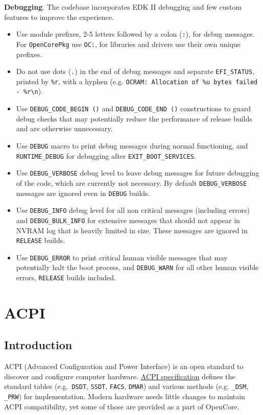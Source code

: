 \documentclass[]{article}
\makeatletter
\providecommand{\tightlist}{%
  \setlength{\itemsep}{0pt}\setlength{\parskip}{0pt}}
\renewcommand{\label}[1]{%
\zref@wrapper@immediate{\oldlabel{#1}}}  %
\makeatother
\begin{document}
\textbf{Debugging}. The codebase incorporates EDK II debugging and few custom features to improve the experience.
\begin{itemize}
\tightlist
\item Use module prefixes, 2-5 letters followed by a colon (\texttt{:}), for debug messages. For \texttt{OpenCorePkg}
use \texttt{OC:}, for libraries and drivers use their own unique prefixes.
\item Do not use dots (\texttt{.}) in the end of debug messages and separate \texttt{EFI\_STATUS}, printed by
\texttt{\%r}, with a hyphen (e.g. \texttt{OCRAM: Allocation of \%u bytes failed - \%r\textbackslash n}).
\item Use \texttt{DEBUG\_CODE\_BEGIN ()} and \texttt{DEBUG\_CODE\_END ()} constructions to guard debug checks
that may potentially reduce the performance of release builds and are otherwise unnecessary.
\item Use \texttt{DEBUG} macro to print debug messages during normal functioning, and \texttt{RUNTIME\_DEBUG} for
debugging after \texttt{EXIT\_BOOT\_SERVICES}.
\item Use \texttt{DEBUG\_VERBOSE} debug level to leave debug messages for future debugging of the code, which
are currently not necessary. By default \texttt{DEBUG\_VERBOSE} messages are ignored even in \texttt{DEBUG} builds.
\item Use \texttt{DEBUG\_INFO} debug level for all non critical messages (including errors) and \texttt{DEBUG\_BULK\_INFO}
for extensive messages that should not appear in NVRAM log that is heavily limited in size. These messages are ignored in
\texttt{RELEASE} builds.
\item Use \texttt{DEBUG\_ERROR} to print critical human visible messages that may potentially halt the boot process, and
\texttt{DEBUG\_WARN} for all other human visible errors, \texttt{RELEASE} builds included.
\end{itemize}

\section{ACPI}\label{acpi}

\subsection{Introduction}\label{acpiintro}

ACPI (Advanced Configuration and Power Interface) is an open standard to
discover and configure computer hardware.
\href{https://uefi.org/specifications}{ACPI specification} defines the
standard tables (e.g.~\texttt{DSDT}, \texttt{SSDT}, \texttt{FACS}, \texttt{DMAR})
and various methods (e.g. \texttt{\_DSM}, \texttt{\_PRW}) for implementation.
Modern hardware needs little changes to maintain ACPI compatibility, yet
some of those are provided as a part of OpenCore.
\end{document}
